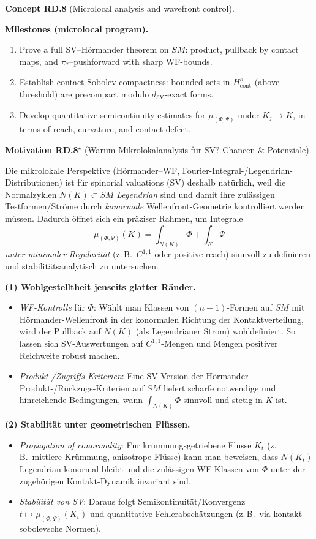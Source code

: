 \documentclass[10pt, letterpaper]{article}
\newcommand{\CustomHeading}[3]{%
  \par\medskip\noindent%
  \textbf{#1 #2} \textnormal{(#3)}.\enskip%
}
\newenvironment{CONC}[2]{\begin{unitbox}\CustomHeading{Concept}{#1}{#2}}{\end{unitbox}}
\newenvironment{MOT}[2]{\begin{unitbox}\CustomHeading{Motivation}{#1}{#2}}{\end{unitbox}}
\begin{document}
\begin{CONC}{RD.8}{Microlocal analysis and wavefront control}
\medskip\noindent\textbf{Milestones (microlocal program).}
\begin{enumerate}[label=(\roman*)]
\item Prove a full SV–Hörmander theorem on $SM$:
product, pullback by contact maps, and $\pi_*$–pushforward with sharp WF-bounds.
\item Establish contact Sobolev compactness:
bounded sets in $H^s_{\mathrm{cont}}$ (above threshold) are precompact modulo $d_{\operatorname{SV}}$-exact forms.
\item Develop quantitative semicontinuity estimates for $\mu_{(\Phi,\Psi)}$ under $K_j\to K$,
in terms of reach, curvature, and contact defect.
\end{enumerate}
\end{CONC}

\begin{MOT}{RD.8$^\star$}{Warum Mikrolokalanalysis für SV? Chancen \& Potenziale}

Die mikrolokale Perspektive (Hörmander–WF, Fourier-Integral-/Legendrian-Distributionen) ist für spinorial valuations (SV) deshalb natürlich, weil die Normalzyklen $N(K)\subset SM$ \emph{Legendrian} sind und damit ihre zulässigen Testformen/Ströme durch \emph{konormale} Wellenfront-Geometrie kontrolliert werden müssen. Dadurch öffnet sich ein präziser Rahmen, um Integrale
\[
\mu_{(\Phi,\Psi)}(K)=\int_{N(K)}\Phi+\int_K\Psi
\]
\emph{unter minimaler Regularität} (z.\,B.\ $C^{1,1}$ oder positive reach) sinnvoll zu definieren und stabilitätsanalytisch zu untersuchen.

\medskip\noindent
\textbf{(1) Wohlgestellt­heit jenseits glatter Ränder.}
\begin{itemize}
  \item \emph{WF-Kontrolle} für $\Phi$: Wählt man Klassen von $(n\!-\!1)$-Formen auf $SM$ mit Hörmander-Wellenfront in der konormalen Richtung der Kontaktverteilung, wird der Pullback auf $N(K)$ (als Legendrianer Strom) wohldefiniert. So lassen sich SV-Auswertungen auf $C^{1,1}$-Mengen und Mengen positiver Reichweite robust machen.
  \item \emph{Produkt-/Zugriffs-Kriterien}: Eine SV-Version der Hörmander-Produkt-/Rückzugs-Kriterien auf $SM$ liefert scharfe notwendige und hinreichende Bedingungen, wann $\int_{N(K)}\Phi$ sinnvoll und stetig in $K$ ist.
\end{itemize}

\medskip\noindent
\textbf{(2) Stabilität unter geometrischen Flüssen.}
\begin{itemize}
  \item \emph{Propagation of conormality}: Für krümmungsgetriebene Flüsse $K_t$ (z.\,B.\ mittlere Krümmung, anisotrope Flüsse) kann man beweisen, dass $N(K_t)$ Legendrian-konormal bleibt und die zulässigen WF-Klassen von $\Phi$ unter der zugehörigen Kontakt-Dynamik invariant sind.
  \item \emph{Stabilität von SV}: Daraus folgt Semikontinuität/Konvergenz $t\mapsto \mu_{(\Phi,\Psi)}(K_t)$ und quantitative Fehlerabschätzungen (z.\,B.\ via kontakt-sobolevsche Normen).
\end{itemize}


\end{MOT}
\end{document}
